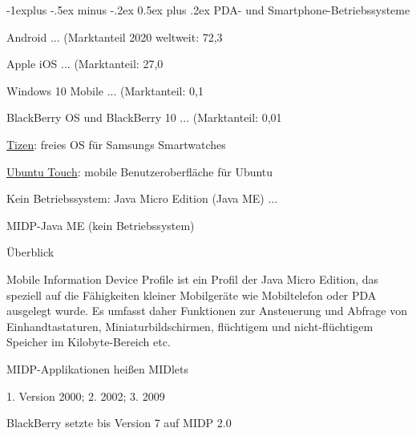 \documentclass[a4paper, 8pt]{article}
\makeatletter
\renewcommand{\subsection}{\@startsection{subsection}{2}{0mm}%
                                {-1explus -.5ex minus -.2ex}%
                                {0.5ex plus .2ex}%
                                {\normalfont\normalsize\bfseries}}
\makeatother
\begin{document}
\begin{multicols*}{2}
  \subsection{PDA- und Smartphone-Betriebssysteme}
  \begin{itemize*}
    \item Android ... (Marktanteil 2020 weltweit: 72,3%
    \item Apple iOS ... (Marktanteil: 27,0%
    \item Windows 10 Mobile ... (Marktanteil: 0,1%
    \item BlackBerry OS und BlackBerry 10 ... (Marktanteil: 0,01%
    \item \href{http://de.wikipedia.org/wiki/Tizen}{Tizen}: freies OS für Samsungs Smartwatches
    \item \href{http://de.wikipedia.org/wiki/Ubuntu_Touch}{Ubuntu Touch}: mobile Benutzeroberfläche für Ubuntu
    \item Kein Betriebssystem: Java Micro Edition (Java ME) ...
  \end{itemize*}

  MIDP-Java ME (kein Betriebssystem)
  \begin{itemize*}
    \item Überblick
    \begin{itemize*}
      \item Mobile Information Device Profile ist ein Profil der Java Micro Edition, das speziell auf die Fähigkeiten kleiner Mobilgeräte wie Mobiltelefon oder PDA ausgelegt wurde. Es umfasst daher Funktionen zur Ansteuerung und Abfrage von Einhandtastaturen, Miniaturbildschirmen, flüchtigem und nicht-flüchtigem Speicher im Kilobyte-Bereich etc.
      \item MIDP-Applikationen heißen MIDlets
    \end{itemize*}
    \item 1. Version 2000; 2. 2002; 3. 2009
    \item BlackBerry setzte bis Version 7 auf MIDP 2.0
  \end{itemize*}


\end{multicols*}
\end{document}
